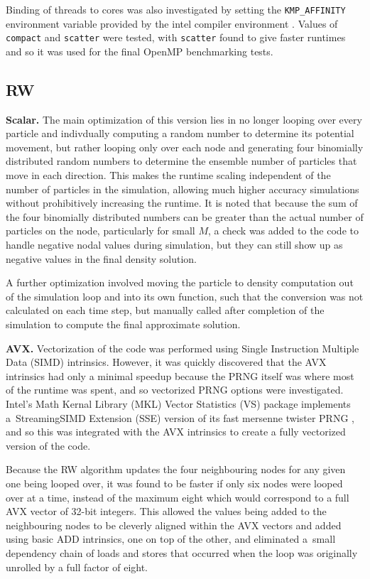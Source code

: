 \documentclass[letterpaper]{article}
\newcommand{\mypar}[1]{{\bf #1.}}
\begin{document}
Binding of threads to cores was also investigated by setting the {\tt KMP\_AFFINITY} environment variable provided by the intel compiler environment \cite{affinity}. Values of {\tt compact} and {\tt scatter} were tested, with {\tt scatter} found to give faster runtimes and so it was used for the final OpenMP benchmarking tests.


\subsection{RW}\label{subsec:RW_method}

\mypar{Scalar}
The main optimization of this version lies in no longer looping over every particle and indivdually computing a random number to determine its potential movement, but rather looping only over each node and generating four binomially distributed random numbers to determine the ensemble number of particles that move in each direction. This makes the runtime scaling independent of the number of particles in the simulation, allowing much higher accuracy simulations  without prohibitively increasing the runtime. It is noted that because the sum of the four binomially distributed numbers can be greater than the actual number of particles on the node, particularly for small $M$, a check was added to the code to handle negative nodal values during simulation, but they can still show up as negative values in the final density solution.

A further optimization involved moving the particle to density computation out of the simulation loop and into its own function, such that the conversion was not calculated on each time step, but manually called after completion of the simulation to compute the final approximate solution.

\mypar{AVX}
Vectorization of the code was performed using Single Instruction Multiple Data (SIMD) intrinsics. However, it was quickly discovered that the AVX intrinsics had only a minimal speedup because the PRNG itself was where most of the runtime was spent, and so vectorized PRNG options were investigated. Intel's Math Kernal Library (MKL) Vector Statistics (VS) package implements a~Streaming\linebreak SIMD Extension (SSE) version of its fast mersenne twister PRNG \cite{SFMT}, and so this was integrated with the AVX intrinsics to create a fully vectorized version of the code.

Because the RW algorithm updates the four neighbouring nodes for any given one being looped over, it was found to be faster if only six nodes were looped over at a time, instead of the maximum eight which would correspond to a full AVX vector of 32-bit integers. This allowed the values being added to the neighbouring nodes to be cleverly aligned within the AVX vectors and added using basic ADD intrinsics, one on top of the other, and eliminated a~small dependency chain of loads and stores that occurred when the loop was originally unrolled by a full factor of eight.
\end{document}
